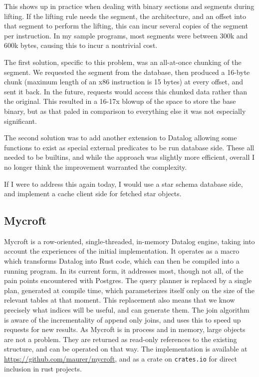 This shows up in practice when dealing with binary sections and segments during lifting.
If the lifting rule needs the segment, the architecture, and an offset into that segment to perform the lifting, this can incur several copies of the segment per instruction.
In my sample programs, most segments were between 300k and 600k bytes, causing this to incur a nontrivial cost.

The first solution, specific to this problem, was an all-at-once chunking of the segment.
We requested the segment from the database, then produced a 16-byte chunk (maximum length of an x86 instruction is 15 bytes) at every offset, and sent it back.
In the future, requests would access this chunked data rather than the original.
This resulted in a 16-17x blowup of the space to store the base binary, but as that paled in comparison to everything else it was not especially significant.

The second solution was to add another extension to Datalog allowing some functions to exist as special external predicates to be run database side.
These all needed to be builtins, and while the approach was slightly more efficient, overall I no longer think the improvement warranted the complexity.

If I were to address this again today, I would use a star schema database side, and implement a cache client side for fetched star objects.

\subsection{Mycroft}
\label{sec:mycroft}
Mycroft is a row-oriented, single-threaded, in-memory Datalog engine, taking into account the experiences of the initial implementation.
It operates as a macro which transforms Datalog into Rust code, which can then be compiled into a running program.
In its current form, it addresses most, though not all, of the pain points encountered with Postgres.
The query planner is replaced by a single plan, generated at compile time, which parameterizes itself only on the size of the relevant tables at that moment.
This replacement also means that we know precisely what indices will be useful, and can generate them.
The join algorithm is aware of the incrementality of append only joins, and uses this to speed up requests for new results. 
As Mycroft is in process and in memory, large objects are not a problem.
They are returned as read-only references to the existing structure, and can be operated on that way.
The implementation is available at \url{https://github.com/maurer/mycroft}, and as a crate on \texttt{crates.io} for direct inclusion in rust projects.

